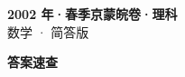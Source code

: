 \documentclass[zihao=-4, a4paper]{ctexart}
\begin{document}
\begin{center}
  {\Large\bfseries 2002 年·春季京蒙皖卷·理科}\\[4pt]
  {\large 数学 · 简答版}
\end{center}
\medskip
{}

\clearpage
{}
\begin{center}{\Large\bfseries 答案速查}\end{center}
\medskip

\end{document}
